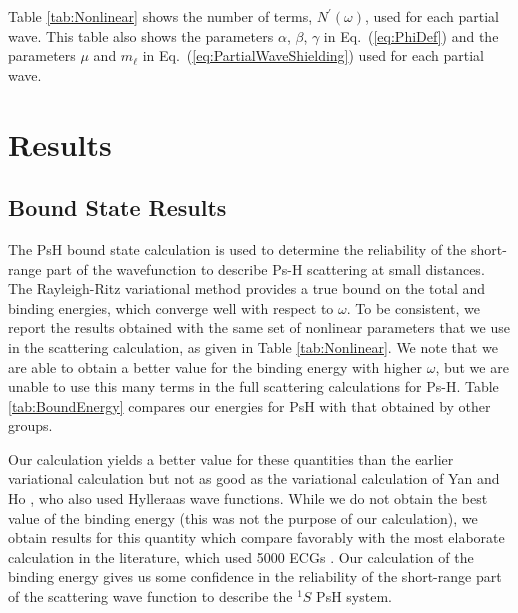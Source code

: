 \documentclass[preprint,showpacs,showkeys,preprintnumbers,amsmath,amssymb,longbibliography,pra,aps]{revtex4-1}
\begin{document}
Table \ref{tab:Nonlinear} shows the number of terms, $N^\prime(\omega)$, used 
for each partial wave. This table also shows the parameters $\alpha$, $\beta$,
$\gamma$ in Eq.~(\ref{eq:PhiDef}) and the parameters $\mu$ and $m_\ell$ in 
Eq.~(\ref{eq:PartialWaveShielding}) used for each partial wave.


\section{Results}
\label{sec:Results}

\subsection{Bound State Results}

The PsH bound state calculation is used to determine the reliability of the 
short-range part of the wavefunction to describe Ps-H scattering at small 
distances. The Rayleigh-Ritz variational method provides a true bound on the 
total and binding energies, which converge well with respect to $\omega$. To 
be consistent, we report the results obtained with the same set of nonlinear 
parameters that we use in the scattering calculation, as given in
Table \ref{tab:Nonlinear}. We note that we are able to obtain a better value for
the binding energy with higher $\omega$, but we are unable to use this many
terms in the full scattering calculations for Ps-H. Table \ref{tab:BoundEnergy} 
compares our energies for PsH with that obtained by other groups.

Our calculation yields a better value for these quantities than the earlier 
variational calculation \cite{VanReeth2003,VanReeth2004} but not as good as 
the variational calculation of Yan and Ho \cite{Yan1999}, who also used 
Hylleraas wave functions. While we do not obtain the best value of the 
binding energy (this was not the purpose of our calculation), we obtain 
results for this quantity which compare favorably with the most elaborate 
calculation in the literature, which used 5000 ECGs \cite{Bubin2006}. Our 
calculation of the binding energy gives us some confidence in the reliability 
of the short-range part of the scattering wave function to describe the $^1S$ 
PsH system.
\end{document}
